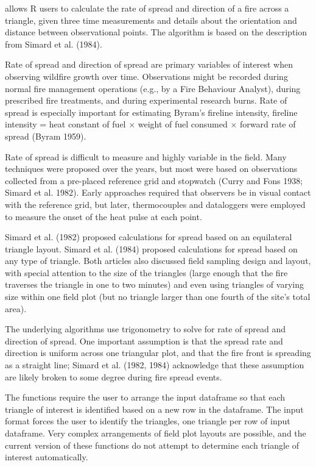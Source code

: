 \documentclass[a4paper]{book}
\begin{document}
%
\begin{Details}\relax
{} allows R users to calculate the rate of spread and direction of
a fire across a triangle, given three time measurements and details about
the orientation and distance between observational points. The algorithm is
based on the description from Simard et al. (1984).

Rate of spread and direction of spread are primary variables of interest
when observing wildfire growth over time. Observations might be recorded
during normal fire management operations (e.g., by a Fire Behaviour
Analyst), during prescribed fire treatments, and during experimental
research burns. Rate of spread is especially important for estimating
Byram's fireline intensity, fireline intensity = heat constant of fuel ×
weight of fuel consumed × forward rate of spread (Byram 1959).

Rate of spread is difficult to measure and highly variable in the field.
Many techniques were proposed over the years, but most were based on
observations collected from a pre-placed reference grid and stopwatch (Curry
and Fons 1938; Simard et al. 1982). Early approaches required that observers
be in visual contact with the reference grid, but later, thermocouples and
dataloggers were employed to measure the onset of the heat pulse at each
point.

Simard et al. (1982) proposed calculations for spread based on an
equilateral triangle layout. Simard et al. (1984) proposed calculations for
spread based on any type of triangle. Both articles also discussed field
sampling design and layout, with special attention to the size of the
triangles (large enough that the fire traverses the triangle in one to two
minutes) and even using triangles of varying size within one field plot (but
no triangle larger than one fourth of the site's total area).

The underlying algorithms use trigonometry to solve for rate of spread and
direction of spread. One important assumption is that the spread rate and
direction is uniform across one triangular plot, and that the fire front is
spreading as a straight line; Simard et al. (1982, 1984) acknowledge that
these assumption are likely broken to some degree during fire spread events.

The functions require the user to arrange the input dataframe so that each
triangle of interest is identified based on a new row in the dataframe. The
input format forces the user to identify the triangles, one triangle per row
of input dataframe. Very complex arrangements of field plot layouts are
possible, and the current version of these functions do not attempt to
determine each triangle of interest automatically.
\end{Details}
\end{document}
